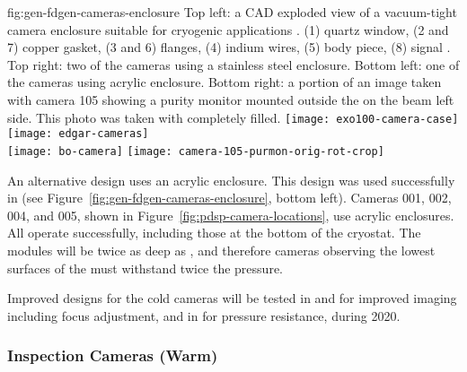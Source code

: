 \begin{dunefigure}{fig:gen-fdgen-cameras-enclosure}
  {Top left: a CAD exploded view of a vacuum-tight camera enclosure suitable for cryogenic applications \cite{Delaquis:2013hva}.
    (1) quartz window, (2 and 7) copper gasket, (3 and 6) flanges, (4) indium wires, (5) body piece, (8) signal \fdth.
    Top right: two of the  cameras using a stainless steel enclosure. 
    Bottom left: one of the  cameras using acrylic enclosure.
    Bottom right: a portion of an image taken with  camera 105 showing a purity monitor mounted outside the  on the beam left side. This photo was taken with  completely filled.
  }
  \texttt{[image: exo100-camera-case]}%
  \texttt{[image: edgar-cameras]}\\
  \hfill \texttt{[image: bo-camera]}%
  \hfill \texttt{[image: camera-105-purmon-orig-rot-crop]}%
  \hfill
\end{dunefigure}

An alternative design uses an acrylic enclosure.
This design was used successfully in  (see Figure~\ref{fig:gen-fdgen-cameras-enclosure}, bottom left). Cameras 001, 002, 004, and 005, shown in Figure~\ref{fig:pdsp-camera-locations}, use acrylic enclosures. 
All operate successfully, including those at the bottom of the cryostat. %
The  modules will be twice as deep as , and therefore cameras observing the lowest surfaces of the  must withstand twice the pressure.

Improved designs for the cold cameras will be tested in  and  for improved imaging including focus adjustment, and in  for pressure resistance, during 2020. 



\subsubsection{Inspection Cameras (Warm)}

